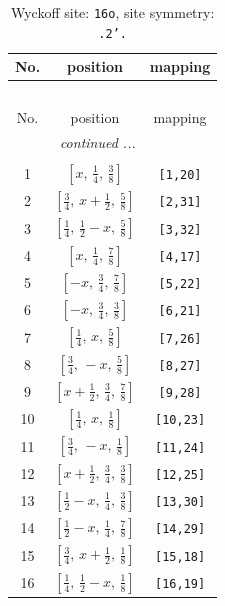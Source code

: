\documentclass[fleqn,8pt]{jsarticle}
\begin{document}
\renewcommand{\arraystretch}{1.2}
\begin{longtable}{ccc}
\caption{Wyckoff site: {\tt 16o}, site symmetry: {\tt .2'.}}
 \\
 \hline \hline
No. & position & mapping \\ \hline \endfirsthead

\multicolumn{2}{l}{\tablename\ \thetable{}} \\
 \hline \hline
No. & position & mapping \\ \hline \endhead

 \hline \hline
\multicolumn{2}{r}{\footnotesize\it continued ...} \\ \endfoot

 \hline \hline
\multicolumn{2}{r}{} \\ \endlastfoot

1 & $\left[ x,\, \frac{1}{4},\, \frac{3}{8} \right]$ & {\tt [1,20]} \\ \hline
2 & $\left[ \frac{3}{4},\, x + \frac{1}{2},\, \frac{5}{8} \right]$ & {\tt [2,31]} \\ \hline
3 & $\left[ \frac{1}{4},\, \frac{1}{2} - x,\, \frac{5}{8} \right]$ & {\tt [3,32]} \\ \hline
4 & $\left[ x,\, \frac{1}{4},\, \frac{7}{8} \right]$ & {\tt [4,17]} \\ \hline
5 & $\left[ - x,\, \frac{3}{4},\, \frac{7}{8} \right]$ & {\tt [5,22]} \\ \hline
6 & $\left[ - x,\, \frac{3}{4},\, \frac{3}{8} \right]$ & {\tt [6,21]} \\ \hline
7 & $\left[ \frac{1}{4},\, x,\, \frac{5}{8} \right]$ & {\tt [7,26]} \\ \hline
8 & $\left[ \frac{3}{4},\, - x,\, \frac{5}{8} \right]$ & {\tt [8,27]} \\ \hline
9 & $\left[ x + \frac{1}{2},\, \frac{3}{4},\, \frac{7}{8} \right]$ & {\tt [9,28]} \\ \hline
10 & $\left[ \frac{1}{4},\, x,\, \frac{1}{8} \right]$ & {\tt [10,23]} \\ \hline
11 & $\left[ \frac{3}{4},\, - x,\, \frac{1}{8} \right]$ & {\tt [11,24]} \\ \hline
12 & $\left[ x + \frac{1}{2},\, \frac{3}{4},\, \frac{3}{8} \right]$ & {\tt [12,25]} \\ \hline
13 & $\left[ \frac{1}{2} - x,\, \frac{1}{4},\, \frac{3}{8} \right]$ & {\tt [13,30]} \\ \hline
14 & $\left[ \frac{1}{2} - x,\, \frac{1}{4},\, \frac{7}{8} \right]$ & {\tt [14,29]} \\ \hline
15 & $\left[ \frac{3}{4},\, x + \frac{1}{2},\, \frac{1}{8} \right]$ & {\tt [15,18]} \\ \hline
16 & $\left[ \frac{1}{4},\, \frac{1}{2} - x,\, \frac{1}{8} \right]$ & {\tt [16,19]} \\
\end{longtable}
\end{document}
